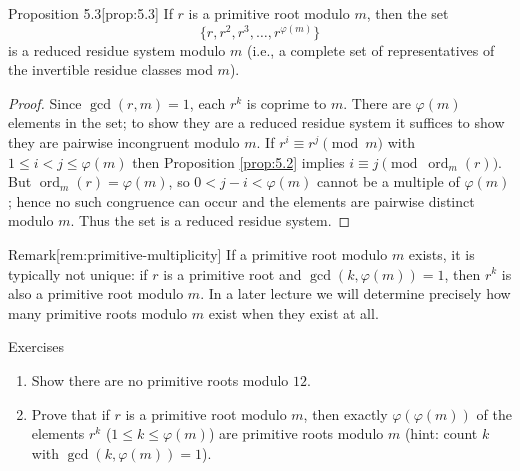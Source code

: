 \documentclass[10pt]{article}
\theoremstyle{definition}
\theoremstyle{plain}
\numberwithin{equation}{section}
\begin{document}
\bigskip

\begin{define}{Proposition 5.3}[prop:5.3]
If $r$ is a primitive root modulo $m$, then the set
\[
\{r, r^2, r^3, \dots, r^{\varphi(m)}\}
\]
is a reduced residue system modulo $m$ (i.e., a complete set of representatives of the invertible residue classes mod $m$).
\end{define}

\begin{proof}
Since $\gcd(r,m)=1$, each $r^k$ is coprime to $m$. There are $\varphi(m)$ elements in the set; to show they are a reduced residue system it suffices to show they are pairwise incongruent modulo $m$. If $r^i\equiv r^j\pmod m$ with $1\le i<j\le\varphi(m)$ then Proposition \ref{prop:5.2} implies $i\equiv j\pmod{\operatorname{ord}_m(r)}$. But $\operatorname{ord}_m(r)=\varphi(m)$, so $0<j-i<\varphi(m)$ cannot be a multiple of $\varphi(m)$; hence no such congruence can occur and the elements are pairwise distinct modulo $m$. Thus the set is a reduced residue system.
\end{proof}

\begin{define}{Remark}[rem:primitive-multiplicity]
If a primitive root modulo $m$ exists, it is typically not unique: if $r$ is a primitive root and $\gcd(k,\varphi(m))=1$, then $r^k$ is also a primitive root modulo $m$. In a later lecture we will determine precisely how many primitive roots modulo $m$ exist when they exist at all.
\end{define}

\bigskip

\begin{define}{Exercises}
\begin{enumerate}
  \item Show there are no primitive roots modulo $12$.
  \item Prove that if $r$ is a primitive root modulo $m$, then exactly $\varphi(\varphi(m))$ of the elements $r^k$ ($1\le k\le\varphi(m)$) are primitive roots modulo $m$ (hint: count $k$ with $\gcd(k,\varphi(m))=1$).
\end{enumerate}
\end{define}



\newpage
\end{document}
